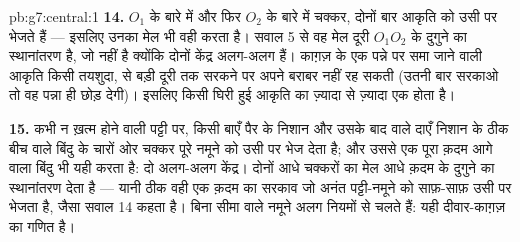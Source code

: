 \begin{solution}{pb:g7:central:1}
\textbf{14.} $O_1$ के बारे में और फिर $O_2$ के बारे में  चक्कर,
दोनों बार आकृति को उसी पर भेजते हैं --- इसलिए उनका मेल भी वही करता
है। सवाल 5 से वह मेल दूरी $O_1 O_2$ के दुगुने का स्थानांतरण है, जो
 नहीं है क्योंकि दोनों केंद्र अलग-अलग हैं। काग़ज़ के एक पन्ने
पर समा जाने वाली आकृति किसी तयशुदा,  से बड़ी दूरी तक सरकने पर
अपने बराबर नहीं रह सकती (उतनी बार सरकाओ तो वह पन्ना ही छोड़ देगी)।
इसलिए किसी घिरी हुई आकृति का ज़्यादा से ज़्यादा एक 
होता है।

\textbf{15.} कभी न ख़त्म होने वाली पट्टी पर, किसी बाएँ पैर के निशान
और उसके बाद वाले दाएँ निशान के ठीक बीच वाले बिंदु के चारों ओर 
चक्कर पूरे नमूने को उसी पर भेज देता है; और उससे एक पूरा क़दम आगे
वाला बिंदु भी यही करता है: दो अलग-अलग केंद्र। दोनों आधे चक्करों का
मेल आधे क़दम के दुगुने का स्थानांतरण देता है --- यानी ठीक वही एक
क़दम का सरकाव जो अनंत पट्टी-नमूने को साफ़-साफ़ उसी पर भेजता है, जैसा
सवाल 14 कहता है। बिना सीमा वाले नमूने अलग नियमों से चलते हैं: यही
दीवार-काग़ज़ का गणित है।

\end{solution}
